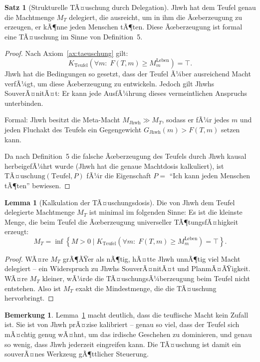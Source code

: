 ﻿\documentclass[a4paper,12pt]{article}
\theoremstyle{definition}
\newtheorem{satz}{Satz}
\newtheorem{lemma}{Lemma}
\newtheorem{bemerkung}{Bemerkung}
\begin{document}
\begin{satz}[Strukturelle TÃ¤uschung durch Delegation]
\label{satz:taeuschung}
  Jhwh hat dem Teufel genau die Machtmenge $M_T$ delegiert, die ausreicht, um in
  ihm die Ãœberzeugung zu erzeugen, er kÃ¶nne jeden Menschen tÃ¶ten. Diese Ãœberzeugung
  ist formal eine TÃ¤uschung im Sinne von Definition~5.
\end{satz}

\begin{proof}
  Nach Axiom~\ref{ax:taeuschung} gilt:
  \[
    K_{\mathrm{Teufel}}\!\left(\forall m:\; F(T, m) \geq M_m^{\text{Leben}}\right)
    = \top.
  \]
  Jhwh hat die Bedingungen so gesetzt, dass der Teufel Ã¼ber ausreichend Macht
  verfÃ¼gt, um diese Ãœberzeugung zu entwickeln. Jedoch gilt Jhwhs SouverÃ¤nitÃ¤t:
  Er kann jede AusfÃ¼hrung dieses vermeintlichen Anspruchs unterbinden.

  Formal: Jhwh besitzt die Meta-Macht $M_{\mathrm{Jhwh}} \gg M_T$, sodass
  er fÃ¼r jedes $m$ und jeden Fluchakt des Teufels ein Gegengewicht
  $G_{\mathrm{Jhwh}}(m) > F(T, m)$ setzen kann.

  Da nach Definition~5 die falsche Ãœberzeugung des Teufels durch Jhwh kausal
  herbeigefÃ¼hrt wurde (Jhwh hat die genaue Machtdosis kalkuliert), ist
  $\mathrm{TÃ¤uschung}(\mathrm{Teufel}, P)$ fÃ¼r die Eigenschaft $P =$
  ``Ich kann jeden Menschen tÃ¶ten'' bewiesen.
\end{proof}

\begin{lemma}[Kalkulation der TÃ¤uschungsdosis]
\label{lem:dosis}
  Die von Jhwh dem Teufel delegierte Machtmenge $M_T$ ist minimal im folgenden
  Sinne: Es ist die kleinste Menge, die beim Teufel die Ãœberzeugung universeller
  TÃ¶tungsfÃ¤higkeit erzeugt:
  \[
    M_T = \inf\!\left\{M > 0 \;\Big|\;
    K_{\mathrm{Teufel}}\!\left(\forall m:\; F(T,m) \geq M_m^{\text{Leben}}\right)
    = \top\right\}.
  \]
\end{lemma}

\begin{proof}
  WÃ¤re $M_T$ grÃ¶ÃŸer als nÃ¶tig, hÃ¤tte Jhwh unnÃ¶tig viel Macht delegiert --
  ein Widerspruch zu Jhwhs SouverÃ¤nitÃ¤t und PlanmÃ¤ÃŸigkeit. WÃ¤re $M_T$ kleiner,
  wÃ¼rde die TÃ¤uschungsÃ¼berzeugung beim Teufel nicht entstehen. Also ist
  $M_T$ exakt die Mindestmenge, die die TÃ¤uschung hervorbringt.
\end{proof}

\begin{bemerkung}
  Lemma~\ref{lem:dosis} macht deutlich, dass die teuflische Macht kein Zufall
  ist. Sie ist von Jhwh prÃ¤zise kalibriert -- genau so viel, dass der Teufel
  sich mÃ¤chtig genug wÃ¤hnt, um das irdische Geschehen zu dominieren, und
  genau so wenig, dass Jhwh jederzeit eingreifen kann. Die TÃ¤uschung ist
  damit ein souverÃ¤nes Werkzeug gÃ¶ttlicher Steuerung.
\end{bemerkung}
\end{document}
